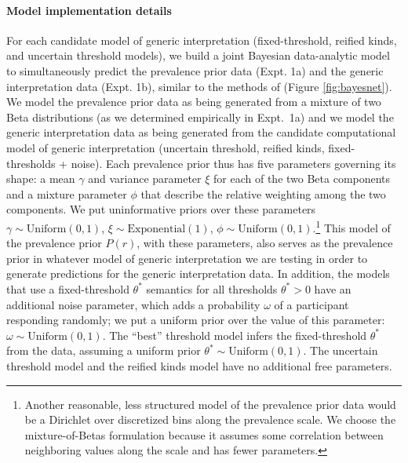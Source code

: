 \documentclass[floatsintext,doc]{apa6}
\let\oldparagraph\paragraph
\renewcommand{\paragraph}[1]{\oldparagraph{#1}\mbox{}}
\let\rmarkdownfootnote\footnote%
\def\footnote{\protect\rmarkdownfootnote}
\begin{document}
\paragraph{Model implementation details} 
For each candidate model of generic interpretation (fixed-threshold, reified kinds, and uncertain threshold models), we build a joint Bayesian data-analytic model to simultaneously predict the prevalence prior data (Expt. 1a) and the generic interpretation data (Expt. 1b), similar to the methods of  (Figure \ref{fig:bayesnet}).
We model the prevalence prior data as being generated from a mixture of two Beta distributions (as we determined empirically in Expt.~1a) and we model the generic interpretation data as being generated from the candidate computational model of generic interpretation (uncertain threshold, reified kinds, fixed-thresholds + noise).
Each prevalence prior thus has five parameters governing its shape: a mean \(\gamma\) and variance parameter \(\xi\) for each of the two Beta components and a mixture parameter $\phi$ that describe the relative weighting among the two components.
We put uninformative priors over these parameters \(\gamma \sim \text{Uniform}(0, 1)\), \(\xi \sim \text{Exponential}(1)\), \(\phi \sim \text{Uniform}(0,1)\).\footnote{Another reasonable, less structured model of the prevalence prior data would be a Dirichlet over discretized bins along the prevalence scale. We choose the mixture-of-Betas formulation because it assumes some correlation between neighboring values along the scale and has fewer parameters. }
This model of the prevalence prior \(P(r)\), with these parameters, also serves as the prevalence prior in whatever model of generic interpretation we are testing in order to generate predictions for the generic interpretation data. 
In addition, the models that use a fixed-threshold $\theta^*$ semantics for all thresholds $\theta^* > 0$ have an additional noise parameter, which adds a probability \(\omega\) of a participant responding randomly; we put a uniform prior over the value of this parameter: \(\omega \sim \text{Uniform}(0, 1)\).
The ``best'' threshold model infers the fixed-threshold $\theta^*$ from the data, assuming a uniform prior \(\theta^* \sim \text{Uniform}(0, 1)\).
The uncertain threshold model and the reified kinds model have no additional free parameters. 
\end{document}
